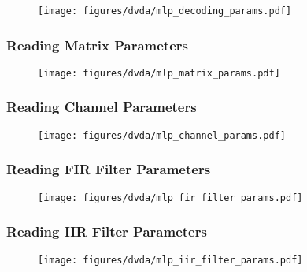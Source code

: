\clearpage

\begin{figure}[h]
  \centering
  \texttt{[image: figures/dvda/mlp\_decoding\_params.pdf]}
\end{figure}


\clearpage

\subsubsection{Reading Matrix Parameters}
\label{mlp:readmatrixparams}
{
  
}

\begin{figure}[h]
  \texttt{[image: figures/dvda/mlp\_matrix\_params.pdf]}
\end{figure}

\clearpage

\subsubsection{Reading Channel Parameters}
\label{mlp:readchannelparams}
{
  
}

\begin{figure}[h]
  \centering
  \texttt{[image: figures/dvda/mlp\_channel\_params.pdf]}
\end{figure}

\clearpage

\subsubsection{Reading FIR Filter Parameters}
\label{mlp:readfirfilterparams}
{
  
}

\begin{figure}[h]
  \texttt{[image: figures/dvda/mlp\_fir\_filter\_params.pdf]}
\end{figure}

\clearpage

\subsubsection{Reading IIR Filter Parameters}
\label{mlp:readiirfilterparams}
{
  
}

\begin{figure}[h]
  \centering
  \texttt{[image: figures/dvda/mlp\_iir\_filter\_params.pdf]}
\end{figure}

